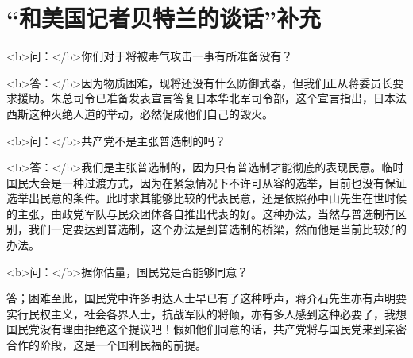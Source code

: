 \section[ “和美国记者贝特兰的谈话”补充（一九三七年十月二十五日）]{ “和美国记者贝特兰的谈话”补充}


<b>问：</b>你们对于将被毒气攻击一事有所准备没有？

<b>答：</b>因为物质困难，现将还没有什么防御武器，但我们正从蒋委员长要求援助。朱总司令已准备发表宣言答复日本华北军司令部，这个宣言指出，日本法西斯这种灭绝人道的举动，必然促成他们自己的毁灭。

<b>问：</b>共产党不是主张普选制的吗？

<b>答：</b>我们是主张普选制的，因为只有普选制才能彻底的表现民意。临时国民大会是一种过渡方式，因为在紧急情况下不许可从容的选举，目前也没有保证选举出民意的条件。此时求其能够比较的代表民意，还是依照孙中山先生在世时候的主张，由政党军队与民众团体各自推出代表的好。这种办法，当然与普选制有区别，我们一定要达到普选制，这个办法是到普选制的桥梁，然而他是当前比较好的办法。

<b>问：</b>据你估量，国民党是否能够同意？

答；困难至此，国民党中许多明达人士早已有了这种呼声，蒋介石先生亦有声明要实行民权主义，社会各界人士，抗战军队的将倾，亦有多人感到这种必要了，我想国民党没有理由拒绝这个提议吧！假如他们同意的话，共产党将与国民党来到亲密合作的阶段，这是一个国利民福的前提。

